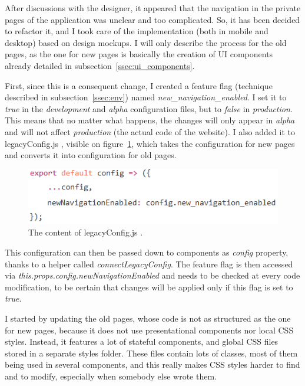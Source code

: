 After discussions with the designer, it appeared that the navigation in the private pages of the application was unclear and too complicated. So, it has been decided to refactor it, and I took care of the implementation (both in mobile and desktop) based on design mockups. I will only describe the process for the old pages, as the one for new pages is basically the creation of UI components already detailed in {\sc subsection}~\ref{ssec:ui_components}.

First, since this is a consequent change, I created a feature flag (technique described in {\sc subsection}~\ref{ssec:env}) named \textit{new\_navigation\_enabled}. I set it to \textit{true} in the \textit{development} and \textit{alpha} configuration files, but to \textit{false} in \textit{production}. This means that no matter what happens, the changes will only appear in \textit{alpha} and will not affect \textit{production} (the actual code of the website). I also added it to \guillemotleft{} legacyConfig.js \guillemotright{}, visible on {\sc figure}~\ref{fig:legacyConfig}, which takes the configuration for new pages and converts it into configuration for old pages.

\begin{figure}[H]
    \centering
    \includegraphics{figure/legacyConfig.png}
    \caption{The content of \guillemotleft{} legacyConfig.js \guillemotright{}.}
    \label{fig:legacyConfig}
\end{figure}

This configuration can then be passed down to components as \textit{config} property, thanks to a helper called \textit{connectLegacyConfig}. The feature flag is then accessed via \textit{this.props.config.newNavigationEnabled} and needs to be checked at every code modification, to be certain that changes will be applied only if this flag is set to \textit{true}.

I started by updating the old pages, whose code is not as structured as the one for new pages, because it does not use presentational components nor local CSS styles. Instead, it features a lot of stateful components, and global CSS files stored in a separate \guillemotleft{} styles \guillemotright{} folder. These files contain lots of classes, most of them being used in several components, and this really makes CSS styles harder to find and to modify, especially when somebody else wrote them.

